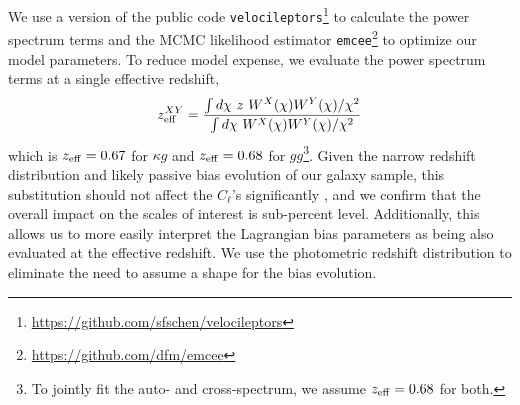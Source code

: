 \documentclass[a4paper,usenatbib]{mnras}
\begin{document}
We use a version of the public code \texttt{velocileptors}\footnote{\url{https://github.com/sfschen/velocileptors}} \citep{velocileptors} to calculate the power spectrum terms and the MCMC likelihood estimator \texttt{emcee}\footnote{\url{https://github.com/dfm/emcee}} \citep{emcee} to optimize our model parameters. 
To reduce model expense, we evaluate the power spectrum terms at a single effective redshift,
\begin{equation}
    z_{\rm eff}^{XY} = \frac{\int d\chi \ z \ W^{X}(\chi)W^{Y}(\chi)/\chi^2}{\int d\chi \ W^{X}(\chi)W^{Y}(\chi)/\chi^2}
\end{equation}
which is $z_{\rm eff} = 0.67$ for $\kappa g$ and $z_{\rm eff} = 0.68$ for $gg$\footnote{To jointly fit the auto- and cross-spectrum, we assume $z_{\rm eff} = 0.68$ for both.}. Given the narrow redshift distribution and likely passive bias evolution of our galaxy sample, this substitution should not affect the $C_{\ell}$'s significantly \citep{Modi++17}, and we confirm that the overall impact on the scales of interest is sub-percent level. Additionally, this allows us to more easily interpret the Lagrangian bias parameters as being also evaluated at the effective redshift. We use the photometric redshift distribution to eliminate the need to assume a shape for the bias evolution.
\end{document}
